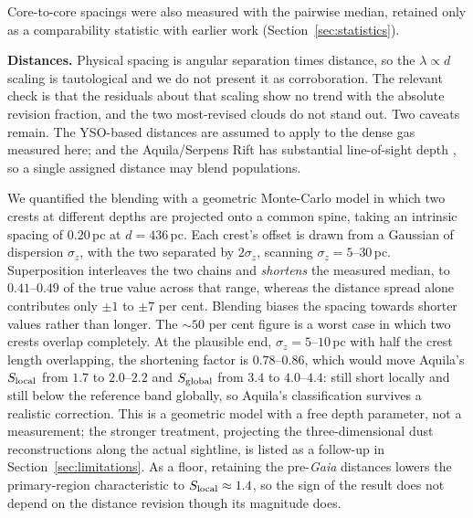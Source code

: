 \documentclass[usenatbib,twoside,twocolumn]{mnras}
\begin{document}
Core-to-core spacings were also measured with the pairwise median, retained only as a comparability statistic with earlier work (Section~\ref{sec:statistics}).

\smallskip\noindent\textbf{Distances.} Physical spacing is angular separation times distance, so the $\lambda\propto d$ scaling is tautological and we do not present it as corroboration. The relevant check is that the residuals about that scaling show no trend with the absolute revision fraction, and the two most-revised clouds do not stand out. Two caveats remain. The YSO-based distances \citep{Zhang2023} are assumed to apply to the dense gas measured here; and the Aquila/Serpens Rift has substantial line-of-sight depth \citep{Zucker2020,Green2024}, so a single assigned distance may blend populations.

We quantified the blending with a geometric Monte-Carlo model in which two crests at different depths are projected onto a common spine, taking an intrinsic spacing of $0.20$\,pc at $d=436$\,pc. Each crest's offset is drawn from a Gaussian of dispersion $\sigma_z$, with the two separated by $2\sigma_z$, scanning $\sigma_z=5$--$30$\,pc. Superposition interleaves the two chains and \emph{shortens} the measured median, to $0.41$--$0.49$ of the true value across that range, whereas the distance spread alone contributes only $\pm1$ to $\pm7$ per cent. Blending biases the spacing towards shorter values rather than longer. The $\sim50$ per cent figure is a worst case in which two crests overlap completely. At the plausible end, $\sigma_z=5$--$10$\,pc with half the crest length overlapping, the shortening factor is $0.78$--$0.86$, which would move Aquila's $S_{\rm local}$ from $1.7$ to $2.0$--$2.2$ and $S_{\rm global}$ from $3.4$ to $4.0$--$4.4$: still short locally and still below the reference band globally, so Aquila's classification survives a realistic correction. This is a geometric model with a free depth parameter, not a measurement; the stronger treatment, projecting the three-dimensional dust reconstructions along the actual sightline, is listed as a follow-up in Section~\ref{sec:limitations}. As a floor, retaining the pre-\textit{Gaia} distances lowers the primary-region characteristic to $S_{\rm local}\approx1.4$, so the sign of the result does not depend on the distance revision though its magnitude does.
\end{document}
